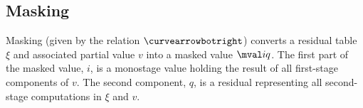 \begin{abstrsyn}


\subsection{Masking}
\label{sec:masking}


Masking (given by the relation $\vsplito$) converts a residual table $\xi$
and associated partial value $v$ into a masked value $\mval i q$.
The first part of the masked value, $i$, is a monostage value holding
the result of all first-stage components of $v$.  The second
component, $q$, is a residual representing all second-stage
computations in $\xi$ and $v$.



\end{abstrsyn}
